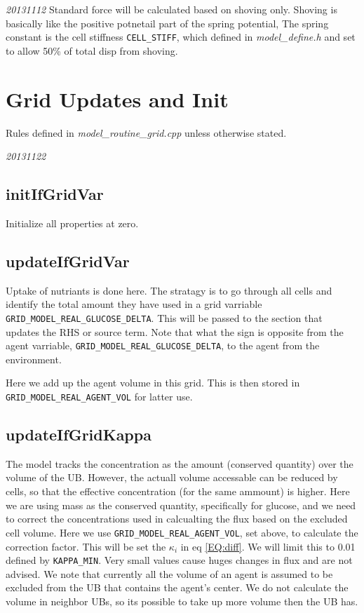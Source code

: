 \documentclass{article}
\begin{document}
{\emph{20131112} Standard force will be calculated based on shoving only.
Shoving is basically like the positive potnetail part of the spring potential,
The spring constant is the cell stiffness \texttt{CELL\_STIFF}, 
which defined in \textit{model\_define.h} and set to allow 50\% of total disp from shoving.


\section{Grid Updates and Init}
Rules defined in \textit{model\_routine\_grid.cpp} unless otherwise stated.

\emph{20131122} 
\subsection{initIfGridVar}
Initialize all properties at zero.

\subsection{updateIfGridVar}
Uptake of nutriants is done here. 
The stratagy is to go through all cells and identify the total amount they have used in a grid varriable \texttt{GRID\_MODEL\_REAL\_GLUCOSE\_DELTA}.
This will be passed to the section that updates the RHS or source term.
Note that what the sign is opposite from the agent varriable, \texttt{GRID\_MODEL\_REAL\_GLUCOSE\_DELTA}, 
to the agent from the environment.

Here we add up the agent volume in this grid.
This is then stored in \texttt{GRID\_MODEL\_REAL\_AGENT\_VOL} for latter use.

\subsection{updateIfGridKappa}


The model tracks the concentration as the amount (conserved quantity) over the volume of the UB.
However, the actuall volume accessable can be reduced by cells, 
so that the effective concentration (for the same ammount) is higher.
Here we are using mass as the conserved quantity, specifically for glucose,
and we need to correct the concentrations used in calcualting the flux based on the excluded cell volume.
Here we use \texttt{GRID\_MODEL\_REAL\_AGENT\_VOL}, set above, 
to calculate the correction factor.
This will be set the $\kappa_i$ in eq \ref{EQ:diff}.
We will limit this to 0.01 defined by \texttt{KAPPA\_MIN}.
Very small values cause huges changes in flux and are not advised.
We note that currently all the volume of an agent is assumed to be excluded from the UB that contains the agent's center.
We do not calculate the volume in neighbor UBs, so its possible to take up more volume then the UB has.

}
\end{document}
